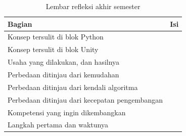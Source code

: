 \begin{table}[htbp]
\centering
\caption{Lembar refleksi akhir semester}
\label{tab:lembar-refleksi}
{\setlength{\tabcolsep}{4pt}\footnotesize%
\begin{tabularx}{\textwidth}{@{}L{4.0cm} Y@{}}
\toprule
\headrow \textbf{Bagian} & \textbf{Isi} \\
\midrule
Konsep tersulit di blok Python & \\[1.6em]
\midrule
Konsep tersulit di blok Unity & \\[1.6em]
\midrule
Usaha yang dilakukan, dan hasilnya & \\[1.6em]
\midrule
Perbedaan ditinjau dari kemudahan & \\[1.4em]
\midrule
Perbedaan ditinjau dari kendali algoritma & \\[1.4em]
\midrule
Perbedaan ditinjau dari kecepatan pengembangan & \\[1.4em]
\midrule
Kompetensi yang ingin dikembangkan & \\[1.4em]
\midrule
Langkah pertama dan waktunya & \\[1.8em]
\bottomrule
\end{tabularx}}
\end{table}
